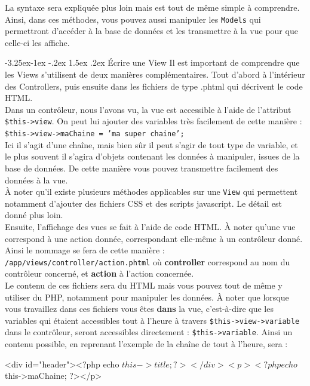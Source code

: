 \documentclass[a4paper,11pt]{article}
\makeatletter
\renewcommand{\subsection}{\@startsection{subsection}{2}{\z@}%
             {-3.25ex\@plus -1ex \@minus -.2ex}%
             {1.5ex \@plus .2ex}%
             {\color{bleuFonce}\normalfont\large\bfseries}}
\makeatother
\begin{document}
La syntaxe sera expliquée plus loin mais est tout de même simple à comprendre.\\

Ainsi, dans ces méthodes, vous pouvez aussi manipuler les \texttt{Models} qui permettront d'accéder à la base de données et les transmettre à la vue pour que celle-ci les affiche.

\subsection{Écrire une View}
Il est important de comprendre que les Views s'utilisent de deux manières complémentaires. Tout d'abord à l'intérieur des Controllers, puis ensuite dans les fichiers de type .phtml qui décrivent le code HTML.\\

Dans un contrôleur, nous l'avons vu, la vue est accessible à l'aide de l'attribut \texttt{\$this->view}. On peut lui ajouter des variables très facilement de cette manière : \texttt{\$this->view->maChaine = 'ma super chaine';}\\
Ici il s'agit d'une chaîne, mais bien sûr il peut s'agir de tout type de variable, et le plus souvent il s'agira d'objets contenant les données à manipuler, issues de la base de données. De cette manière vous pouvez transmettre facilement des données à la vue.\\

À noter qu'il existe plusieurs méthodes applicables sur une \texttt{View} qui permettent notamment d'ajouter des fichiers CSS et des scripts javascript. Le détail est donné plus loin.\\

Ensuite, l'affichage des vues se fait à l'aide de code HTML. À noter qu'une vue correspond à une action donnée, correspondant elle-même à un contrôleur donné. Ainsi le nommage se fera de cette manière : \\\texttt{/app/views/controller/action.phtml} où \textbf{controller} correspond au nom du contrôleur concerné, et \textbf{action} à l'action concernée.\\
Le contenu de ces fichiers sera du HTML mais vous pouvez tout de même y utiliser du PHP, notamment pour manipuler les données. À noter que lorsque vous travaillez dans ces fichiers vous êtes \textbf{dans} la vue, c'est-à-dire que les variables qui étaient accessibles tout à l'heure à travers \texttt{\$this->view->variable} dans le contrôleur, seront accessibles directement : \texttt{\$this->variable}. Ainsi un contenu possible, en reprenant l'exemple de la chaîne de tout à l'heure, sera :
\begin{HTML}
<div id="header"><?php echo $this->title; ?></div>
<p><?php echo $this->maChaine; ?></p>
\end{HTML}
\end{document}
